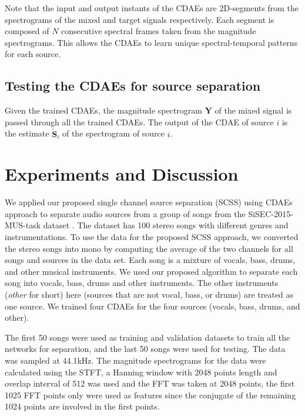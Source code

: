 \documentclass{article}
\begin{document}
Note that the input and output instants of the CDAEs are 2D-segments from the spectrograms of the mixed and target signals respectively. Each segment is composed of $N$ consecutive spectral frames taken from the magnitude spectrograms. This allows the CDAEs to learn unique spectral-temporal patterns for each source. 
%
%
\subsection{Testing the CDAEs for source separation}
\label{sec:test} 
Given the trained CDAEs, the magnitude spectrogram $\mathbf{Y}$ of the mixed signal is passed through all the trained CDAEs. The output of the CDAE of source $i$ is the estimate $\mathbf{\tilde{S}}_i$ of the spectrogram of source $i$. %

\section{Experiments and Discussion}
\label{sec:exp}
We applied our proposed single channel source separation (SCSS) using CDAEs approach to separate audio sources from a group of songs from the SiSEC-2015-MUS-task dataset \cite{ono:15:tsisec}. The dataset has 100 stereo songs with different genres and instrumentations. To use the data for the proposed SCSS approach, we converted the stereo songs into mono by computing the average of the two channels for all songs and sources in the data set. Each song is a mixture of vocals, bass, drums, and other musical instruments. We used our proposed algorithm to separate each song into vocals, bass, drums and other instruments. The other instruments (\textit{other} for short) here (sources that are not vocal, bass, or drums) are treated as one source. We trained four CDAEs for the four sources (vocals, bass, drums, and other). 

The first 50 songs were used as training and validation datasets to train all the networks for separation, and the last 50 songs were used for testing. The data was sampled at 44.1kHz. The magnitude spectrograms for the data were calculated using the STFT, a Hanning window with 2048 points length and overlap interval of 512 was used and the FFT was taken at 2048 points, the first 1025 FFT points only were used as features since the conjugate of the remaining 1024 points are involved in the first points.
\end{document}
